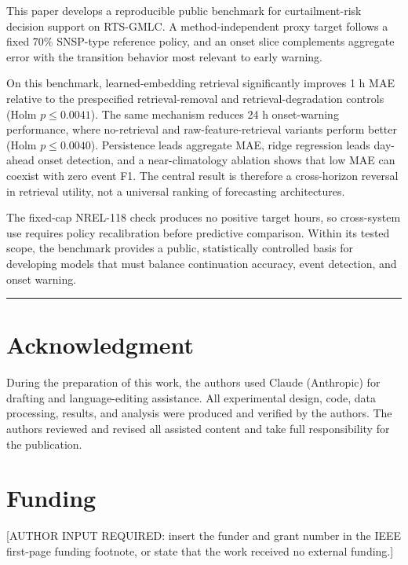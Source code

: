 \documentclass[
  10pt,
  a4paper,
]{article}
\begin{document}
This paper develops a reproducible public benchmark for curtailment-risk
decision support on RTS-GMLC. A method-independent proxy target follows
a fixed 70\% SNSP-type reference policy, and an onset slice complements
aggregate error with the transition behavior most relevant to early
warning.

On this benchmark, learned-embedding retrieval significantly improves 1
h MAE relative to the prespecified retrieval-removal and
retrieval-degradation controls (Holm \(p\leq0.0041\)). The same
mechanism reduces 24 h onset-warning performance, where no-retrieval and
raw-feature-retrieval variants perform better (Holm \(p\leq0.0040\)).
Persistence leads aggregate MAE, ridge regression leads day-ahead onset
detection, and a near-climatology ablation shows that low MAE can
coexist with zero event F1. The central result is therefore a
cross-horizon reversal in retrieval utility, not a universal ranking of
forecasting architectures.

The fixed-cap NREL-118 check produces no positive target hours, so
cross-system use requires policy recalibration before predictive
comparison. Within its tested scope, the benchmark provides a public,
statistically controlled basis for developing models that must balance
continuation accuracy, event detection, and onset warning.

\begin{center}\rule{0.5\linewidth}{0.5pt}\end{center}

\section{Acknowledgment}\label{acknowledgment}

During the preparation of this work, the authors used Claude (Anthropic)
for drafting and language-editing assistance. All experimental design,
code, data processing, results, and analysis were produced and verified
by the authors. The authors reviewed and revised all assisted content
and take full responsibility for the publication.

\section{Funding}\label{funding}

{[}AUTHOR INPUT REQUIRED: insert the funder and grant number in the IEEE
first-page funding footnote, or state that the work received no external
funding.{]}
\end{document}

